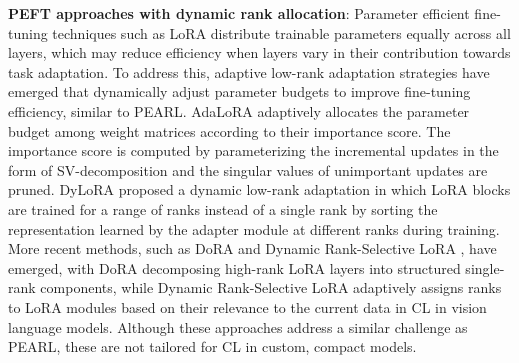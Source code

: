 \documentclass[10pt]{article} %
\begin{document}
\textbf{PEFT approaches with dynamic rank allocation}: Parameter efficient fine-tuning techniques such as LoRA distribute trainable parameters equally across all layers, which may reduce efficiency when layers vary in their contribution towards task adaptation. To address this, adaptive low-rank adaptation strategies  have emerged that dynamically adjust parameter budgets to improve fine-tuning efficiency, similar to PEARL. AdaLoRA \citep{zhang2023adaptive} adaptively allocates the parameter budget among weight matrices according to their importance score. The importance score is computed by parameterizing the incremental updates in the form of SV-decomposition and the singular values of unimportant updates are pruned.  DyLoRA \citep{valipour-etal-2023-dylora} proposed a dynamic low-rank adaptation in which  LoRA blocks are trained for a range of ranks instead
of a single rank by sorting the representation learned by the adapter module at different
ranks during training. More recent methods, such as DoRA \citep{mao-etal-2024-dora} and Dynamic Rank-Selective LoRA \citep{lu2024adaptive}, have emerged, with DoRA decomposing high-rank LoRA layers into structured single-rank components, while Dynamic Rank-Selective LoRA  adaptively assigns ranks to LoRA modules based on their relevance to the current data in CL in vision language models. Although these approaches address a similar challenge as PEARL, these are not tailored for CL in custom, compact models. 
\end{document}
